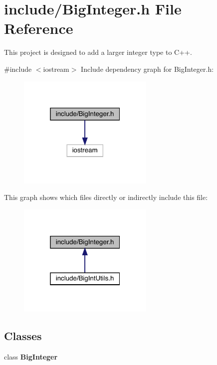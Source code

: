 \section{include/\+Big\+Integer.h File Reference}
\label{_big_integer_8h}


This project is designed to add a larger integer type to C++.  


{\ttfamily \#include $<$iostream$>$}\newline
Include dependency graph for Big\+Integer.\+h\+:\nopagebreak
\begin{figure}[H]
\begin{center}
\leavevmode
\includegraphics[width=184pt]{_big_integer_8h__incl}
\end{center}
\end{figure}
This graph shows which files directly or indirectly include this file\+:\nopagebreak
\begin{figure}[H]
\begin{center}
\leavevmode
\includegraphics[width=184pt]{_big_integer_8h__dep__incl}
\end{center}
\end{figure}
\subsection*{Classes}
\begin{DoxyCompactItemize}
\item 
class \textbf{ Big\+Integer}
\end{DoxyCompactItemize}


